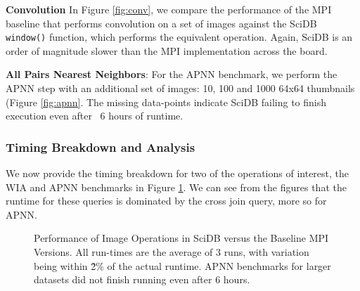 \documentclass[letterpaper,twocolumn,10pt]{article}
\begin{document}
\textbf{Convolution} In Figure \ref{fig:conv}, we compare the performance of the MPI baseline that performs convolution on a set of images against the SciDB \texttt{window()} function, which performs the equivalent operation. Again, SciDB is an order of magnitude slower than the MPI implementation across the board.

\textbf{All Pairs Nearest Neighbors}: For the APNN benchmark, we perform the APNN step with an additional set of images: 10, 100 and 1000 64x64 thumbnails (Figure \ref{fig:apnn}. The missing data-points indicate SciDB failing to finish execution even after ~6 hours of runtime. 


\subsubsection{Timing Breakdown and Analysis}\label{sec:breakdown}
We now provide the timing breakdown for two of the operations of interest, the WIA and APNN benchmarks in Figure \ref{fig:breakdown}. We can see from the figures that the runtime for these queries is dominated by the cross join query, more so for APNN.

\begin{figure}[htp]
\centering
	 \hspace{1 em}
	\caption{Performance of Image Operations in SciDB versus the Baseline MPI Versions. All run-times are the average of 3 runs, with variation being within \~2\% of the actual runtime. APNN benchmarks for larger datasets did not finish running even after 6 hours.}
	\label{fig:breakdown}
\end{figure}
\end{document}
